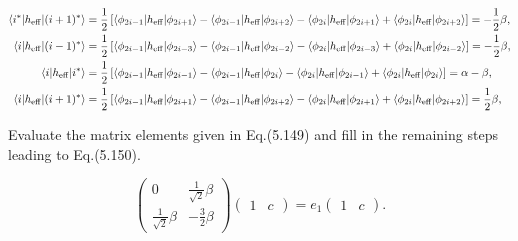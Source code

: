 \documentclass[a4paper]{book}
\newcounter{exercise}[chapter]
\newcounter{solution}[chapter]
\newcommand{\heff}{h_{\rm eff}}
\begin{document}
\begin{solution}
\begin{align*}
		\langle i^* | \heff | (i+1)^* \rangle &= \frac{1}{2} \left[ \langle \phi_{2i-1} | \heff | \phi_{2i+1} \rangle - \langle \phi_{2i-1} | \heff | \phi_{2i+2} \rangle - \langle \phi_{2i} | \heff | \phi_{2i+1} \rangle + \langle \phi_{2i} | \heff | \phi_{2i+2} \rangle \right] = -\frac{1}{2} \beta , \\
		\langle i | \heff | (i-1)^* \rangle &= \frac{1}{2} \left[ \langle \phi_{2i-1} | \heff | \phi_{2i-3} \rangle - \langle \phi_{2i-1} | \heff | \phi_{2i-2} \rangle - \langle \phi_{2i} | \heff | \phi_{2i-3} \rangle + \langle \phi_{2i} | \heff | \phi_{2i-2} \rangle \right] = - \frac{1}{2} \beta , \\
		\langle i | \heff | i^* \rangle &= \frac{1}{2} \left[ \langle \phi_{2i-1} | \heff | \phi_{2i-1} \rangle - \langle \phi_{2i-1} | \heff | \phi_{2i} \rangle - \langle \phi_{2i} | \heff | \phi_{2i-1} \rangle + \langle \phi_{2i} | \heff | \phi_{2i} \rangle \right] = \alpha - \beta , \\
		\langle i | \heff | (i+1)^* \rangle &= \frac{1}{2} \left[ \langle \phi_{2i-1} | \heff | \phi_{2i+1} \rangle - \langle \phi_{2i-1} | \heff | \phi_{2i+2} \rangle - \langle \phi_{2i} | \heff | \phi_{2i+1} \rangle + \langle \phi_{2i} | \heff | \phi_{2i+2} \rangle \right] = \frac{1}{2} \beta , \\
	\end{align*}		
	
	\end{solution}
	
	\begin{exercise}
	Evaluate the matrix elements given in Eq.(5.149) and fill in the remaining steps leading to Eq.(5.150).
	\end{exercise}
	
	\begin{solution}
	
	\[
		\begin{pmatrix}
			0 & \frac{1}{\sqrt{2}}\beta \\ \frac{1}{\sqrt{2}}\beta & -\frac{3}{2} \beta
		\end{pmatrix} \begin{pmatrix}
			1 & c
		\end{pmatrix} = e_1 \begin{pmatrix}
			1 & c
		\end{pmatrix}.
	\]	
	
	\end{solution}
	
\end{document}
